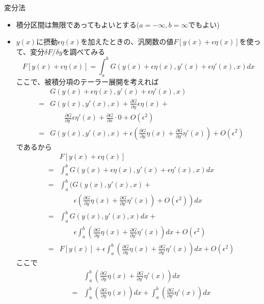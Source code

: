 \documentclass[dvipdfmx,notheorems,t]{beamer}
\begin{document}
\begin{frame}{変分法}
\begin{itemize}
\begin{itemize}
		\item 積分区間は無限であってもよいとする($a = -\infty, b = \infty$でもよい)
		\newline
		\item $y(x)$に摂動$\epsilon \eta(x)$を加えたときの、汎関数の値$F[y(x) + \epsilon \eta(x)]$を使って、変分$\delta F/\delta y$を調べてみる
		\begin{equation}
			F[y(x) + \epsilon \eta(x)] = \int_a^b G(y(x) + \epsilon \eta(x), y'(x) + \epsilon \eta'(x), x) dx
		\end{equation}
		ここで、被積分項のテーラー展開を考えれば
		\begin{eqnarray}
			&& G(y(x) + \epsilon \eta(x), y'(x) + \epsilon \eta'(x), x) \nonumber \\
			&=& G(y(x), y'(x), x) + \frac{\partial G}{\partial y} \epsilon \eta(x) + \nonumber \\
			&& \qquad \frac{\partial G}{\partial y'} \epsilon \eta'(x) + \frac{\partial G}{\partial x} \cdot 0 + O(\epsilon^2) \\
			&=& G(y(x), y'(x), x) + \epsilon \left( \frac{\partial G}{\partial y} \eta(x) + \frac{\partial G}{\partial y'} \eta'(x) \right) + O(\epsilon^2)
		\end{eqnarray}
		であるから
		\begin{eqnarray}
			&& F[y(x) + \epsilon \eta(x)] \nonumber \\
			&=& \int_a^b G(y(x) + \epsilon \eta(x), y'(x) + \epsilon \eta'(x), x) dx \nonumber \\
			&=& \int_a^b \bigg( G(y(x), y'(x), x) + \nonumber \\
			&& \qquad \left. \epsilon \left( \frac{\partial G}{\partial y} \eta(x) + \frac{\partial G}{\partial y'} \eta'(x) \right) + O(\epsilon^2) \right) dx \\
			&=& \int_a^b G(y(x), y'(x), x) dx + \nonumber \\
			&& \qquad \epsilon \int_a^b \left( \frac{\partial G}{\partial y} \eta(x) + \frac{\partial G}{\partial y'} \eta'(x) \right) dx + O(\epsilon^2) \\
			&=& F[y(x)] + \epsilon \int_a^b \left( \frac{\partial G}{\partial y} \eta(x) + \frac{\partial G}{\partial y'} \eta'(x) \right) dx + O(\epsilon^2)
		\end{eqnarray}
		ここで
		\begin{eqnarray}
			&& \int_a^b \left( \frac{\partial G}{\partial y} \eta(x) + \frac{\partial G}{\partial y'} \eta'(x) \right) dx \nonumber \\
			&=& \int_a^b \left( \frac{\partial G}{\partial y} \eta(x) \right) dx + \int_a^b \left( \frac{\partial G}{\partial y'} \eta'(x) \right) dx \\

\end{eqnarray}
\end{itemize}
\end{itemize}
\end{frame}
\end{document}
